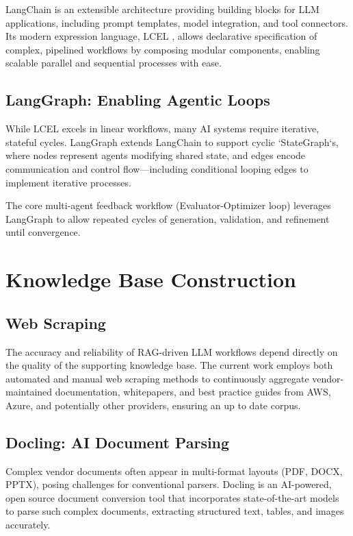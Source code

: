 LangChain \cite{langchain2024docs} is an extensible architecture providing building blocks for LLM applications, including prompt templates, model integration, and tool connectors. Its modern expression language, LCEL \cite{langchain2024lcel}, allows declarative specification of complex, pipelined workflows by composing modular components, enabling scalable parallel and sequential processes with ease.

\subsection{LangGraph: Enabling Agentic Loops}

While LCEL excels in linear workflows, many AI systems require iterative, stateful cycles. LangGraph \cite{langgraph2024docs} extends LangChain to support cyclic `StateGraph`s, where nodes represent agents modifying shared state, and edges encode communication and control flow—including conditional looping edges to implement iterative processes.

The core multi-agent feedback workflow (Evaluator-Optimizer loop) leverages LangGraph to allow repeated cycles of generation, validation, and refinement until convergence.

\section{Knowledge Base Construction}

\subsection{Web Scraping}

The accuracy and reliability of RAG-driven LLM workflows depend directly on the quality of the supporting knowledge base. The current work employs both automated and manual web scraping methods to continuously aggregate vendor-maintained documentation, whitepapers, and best practice guides from AWS, Azure, and potentially other providers, ensuring an up to date corpus.

\subsection{Docling: AI Document Parsing}

Complex vendor documents often appear in multi-format layouts (PDF, DOCX, PPTX), posing challenges for conventional parsers. Docling \cite{docling2025paper} is an AI-powered, open source document conversion tool that incorporates state-of-the-art models to parse such complex documents, extracting structured text, tables, and images accurately.

